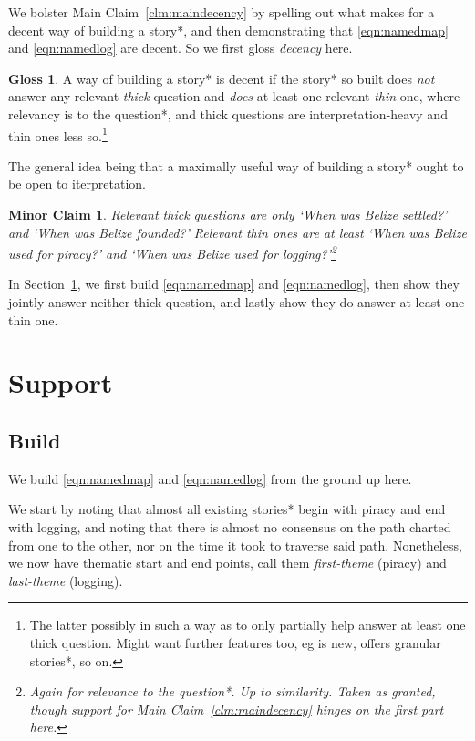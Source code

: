 \documentclass{amsart}
\newcommand{\ment}[1]{\textit{#1}} %
\newtheorem{minrclm}{Minor Claim} %
\theoremstyle{definition}
\newtheorem{gloss}{Gloss} %
\theoremstyle{remark}
\begin{document}
	We bolster Main Claim~\ref{clm:maindecency} by spelling out what makes for a decent way of building a story*, and then demonstrating that \ref{eqn:namedmap} and \ref{eqn:namedlog} are decent. So we first gloss \ment{decency} here.
	\begin{gloss}
	\label{gloss:decency}
		A way of building a story* is decent if the story* so built does \emph{not} answer any relevant \ment{thick} question and \emph{does} at least one relevant \ment{thin} one, where relevancy is to the question*, and thick questions are interpretation-heavy and thin ones less so.\footnote{The latter possibly in such a way as to only partially help answer at least one thick question. Might want further features too, eg is new, offers granular stories*, so on.}
	\end{gloss}
	The general idea being that a maximally useful way of building a story* ought to be open to iterpretation.
	\begin{minrclm}
	\label{clm:minorquestions}
	Relevant thick questions are only `When was Belize settled?' and `When was Belize founded?' Relevant thin ones are at least `When was Belize used for piracy?' and `When was Belize used for logging?'\footnote{Again for relevance to the question*. Up to similarity. Taken as granted, though support for Main Claim~\ref{clm:maindecency} hinges on the first part here.}
	\end{minrclm}
	In Section~\ref{s:support}, we first build \ref{eqn:namedmap} and \ref{eqn:namedlog}, then show they jointly answer neither thick question, and lastly show they do answer at least one thin one.
%
%
%
\section{Support}
\label{s:support}
	\subsection{Build}
	\label{ss:build}
		We build \ref{eqn:namedmap} and \ref{eqn:namedlog} from the ground up here.
		
		We start by noting that almost all existing stories* begin with piracy and end with logging, and noting that there is almost no consensus on the path charted from one to the other, nor on the time it took to traverse said path. Nonetheless, we now have thematic start and end points, call them \ment{first-theme} (piracy) and \ment{last-theme} (logging).
		
\end{document}
